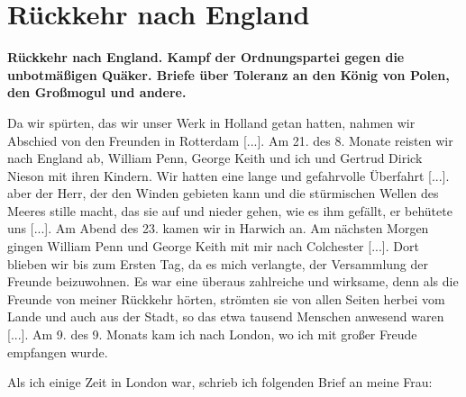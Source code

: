 

\chapter[Rückkehr nach England]{Rückkehr nach England}

\begin{center}
\textbf{Rückkehr nach England. Kampf der Ordnungspartei gegen die
unbotmäßigen Quäker. Briefe über Toleranz an den König von
Polen, den Großmogul und andere.}
\end{center}


Da wir spürten, das wir unser Werk in Holland getan
hatten, nahmen wir Abschied von den Freunden in Rotterdam [...].
Am 21. des 8. Monate reisten wir nach England ab, William
Penn, George 
Keith und ich und Gertrud Dirick 
Nieson mit ihren
Kindern. Wir hatten eine lange und gefahrvolle Überfahrt [...].
aber der Herr, der den Winden gebieten kann und die stürmischen
Wellen des Meeres stille macht, das sie auf und nieder gehen,
wie es ihm gefällt, er behütete uns [...]. Am Abend des 23.
kamen wir in Harwich an. Am nächsten Morgen gingen William
Penn und George Keith mit mir nach Colchester [...]. Dort blieben
wir bis zum Ersten Tag, da es mich verlangte, der Versammlung
der Freunde beizuwohnen. Es war eine überaus zahlreiche und
wirksame, denn als die Freunde von meiner Rückkehr hörten,
strömten sie von allen Seiten herbei vom Lande und auch aus
der Stadt, so das etwa tausend Menschen anwesend waren [...].
Am 9. des 9. Monats kam ich nach London, wo ich mit großer
Freude empfangen wurde.

Als ich einige Zeit in London war, schrieb ich folgenden Brief
an meine Frau:


